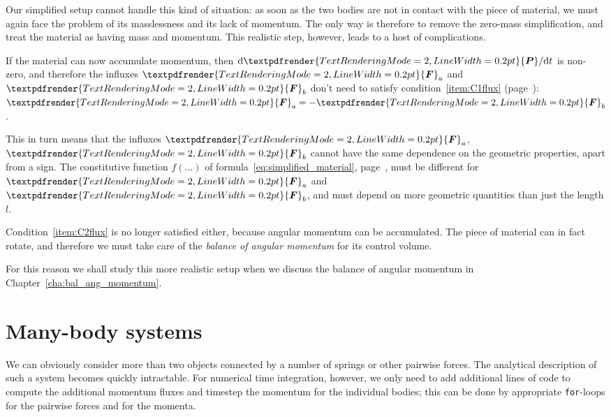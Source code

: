 \documentclass[a4paper,12pt,%
onecolumn,oneside,%
british%
]{memoir}
\renewcommand*{\bm}[1]{\textpdfrender{TextRenderingMode=2,LineWidth=0.2pt}{\boldsymbol{#1}}}
\newcommand*{\di}{\mathrm{d}}%
\renewcommand*{\|}[1][]{\nonscript\:#1\vert\nonscript\:\mathopen{}}
\newcommand*{\chap}{Chapter}%
\newcommand*{\yle}{l}
\newcommand*{\dt}{\di t}
\newcommand*{\yP}{\bm{P}}
\newcommand*{\yF}{\bm{F}}
\newcommand*{\yFa}{\yF_{a}}
\newcommand*{\yFb}{\yF_{b}}
\begin{document}
Our simplified setup cannot handle this kind of situation: as soon as the two bodies are not in contact with the piece of material, we must again face the problem of its masslessness and its lack of momentum. The only way is therefore to remove the zero-mass simplification, and treat the material as having mass and momentum. This realistic step, however, leads to a host of complications.

If the material can now accumulate momentum, then $\di\yP/\dt$ is non-zero, and therefore the influxes $\yFa$ and $\yFb$ don't need to satisfy condition~\ref{item:C1flux} (page~\pageref{item:C1flux}): $\yFa = -\yFb$.

This in turn means that the influxes $\yFa$, $\yFb$ cannot have the same dependence on the geometric properties, apart from a sign. The constitutive function $f(\dotso)$ of formula~\eqref{eq:simplified_material}, page~\pageref{eq:simplified_material}, must
be different for $\yFa$ and $\yFb$, and must depend on more geometric quantities than just the length $\yle$.

Condition~\ref{item:C2flux} is no longer satisfied either, because angular momentum can be accumulated. The piece of material can in fact rotate, and therefore we must take care of the \emph{balance of angular momentum} for its control volume.

For this reason we shall study this more realistic setup when we discuss the balance of angular momentum in \chap~\ref{cha:bal_ang_momentum}.

\section{Many-body systems}
\label{sec:many-body}

We can obviously consider more than two objects connected by a number of springs or other pairwise forces. The analytical description of such a system becomes quickly intractable. For numerical time integration, however, we only need to add additional lines of code to compute the additional momentum fluxes and timestep the momentum for the individual bodies; this can be done by appropriate \texttt{for}-loops for the pairwise forces and for the momenta.
\end{document}
